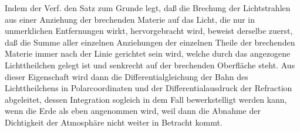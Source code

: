 \documentclass[12pt,a4paper]{article}
\theoremstyle{plain}
\theoremstyle{definition}
\theoremstyle{remark}
\begin{document}
Indem der Verf. den Satz zum Grunde legt, da\ss{} die Brechung der Lichtstrahlen aus einer Anziehung der brechenden Materie auf das Licht, die nur in unmerklichen Entfernungen wirkt, hervorgebracht wird, beweist derselbe zuerst, da\ss{} die Summe aller einzelnen Anziehungen der einzelnen Theile der brechenden Materie immer nach der Linie gerichtet sein wird, welche durch das angezogene Lichttheilchen gelegt ist und senkrecht auf der brechenden Oberfl\"ache steht. Aus dieser Eigenschaft wird dann die Differentialgleichung der Bahn des Lichttheilchens in Polarcoordinaten und der Differentialausdruck der Refraction abgeleitet, dessen Integration sogleich in dem Fall bewerkstelligt werden kann, wenn die Erde als eben angenommen wird, weil dann die Abnahme der Dichtigkeit der Atmosph\"are nicht weiter in Betracht kommt.
\end{document}
